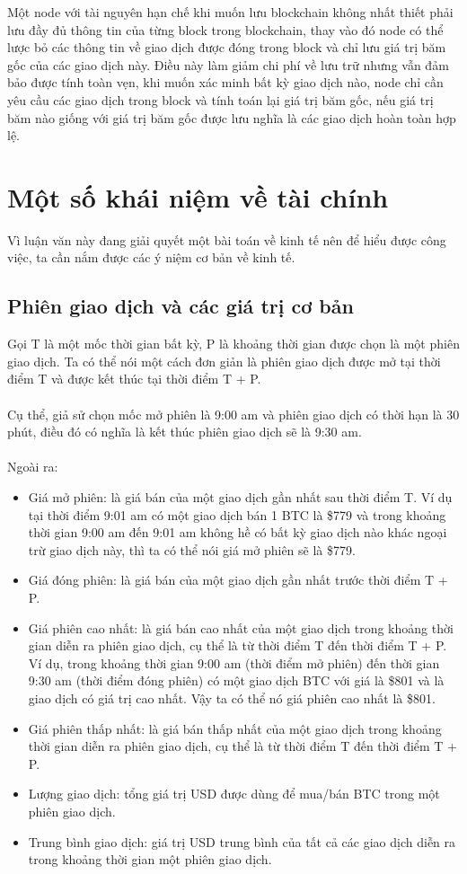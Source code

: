 Một node với tài nguyên hạn chế khi muốn lưu blockchain không nhất thiết phải 
lưu đầy đủ thông tin của từng block trong blockchain, thay vào đó node có thể 
lược bỏ các thông tin về giao dịch được đóng trong block và chỉ lưu giá trị băm 
gốc của các giao dịch này. Điều này làm giảm chi phí về lưu trữ nhưng vẫn đảm 
bảo được tính toàn vẹn, khi muốn xác minh bất kỳ giao dịch nào, node chỉ cần 
yêu cầu các giao dịch trong block và tính toán lại giá trị băm gốc, nếu giá trị 
băm nào giống với giá trị băm gốc được lưu nghĩa là các giao dịch hoàn toàn hợp 
lệ.
\section{Một số khái niệm về tài chính}
Vì luận văn này đang giải quyết một bài toán về kinh tế nên để hiểu được công 
việc, ta cần nắm được các ý niệm cơ bản về kinh tế.
\subsection{Phiên giao dịch và các giá trị cơ bản}
Gọi T là một mốc thời gian bất kỳ, P là khoảng thời gian được chọn là một phiên 
giao dịch. Ta có thể nói một cách đơn giản là phiên giao dịch được mở tại thời 
điểm T và được kết thúc tại thời điểm T + P.\\\\
Cụ thể, giả sử chọn mốc mở phiên là 9:00 am và phiên giao dịch có thời hạn là 
30 phút, điều đó có nghĩa là kết thúc phiên giao dịch sẽ là 9:30 am.\\\\
Ngoài ra:
\begin{itemize}
\item Giá mở phiên: là giá bán của một giao dịch gần nhất sau thời điểm T. Ví dụ tại thời 
điểm 9:01 am có một giao dịch bán 1 BTC là \$779 và trong khoảng thời gian 9:00 am 
đến 9:01 am không hề có bất kỳ giao dịch nào khác ngoại trừ giao dịch này, thì ta có thể 
nói giá mở phiên sẽ là \$779.
\item Giá đóng phiên: là giá bán của một giao dịch gần nhất trước thời điểm T + P.
\item Giá phiên cao nhất: là giá bán cao nhất của một giao dịch trong khoảng thời gian diễn ra phiên 
giao dịch, cụ thể là từ thời điểm T đến thời điểm T + P. Ví dụ, trong khoảng thời gian 9:00 am (thời điểm 
mở phiên) đến thời gian 9:30 am (thời điểm đóng phiên) có một giao dịch BTC với giá là 
\$801 và là giao dịch có giá trị cao nhất. Vậy ta có thể nó giá phiên cao nhất là 
\$801.
\item Giá phiên thấp nhất: là giá bán thấp nhất của một giao dịch trong khoảng thời gian diễn ra phiên 
giao dịch, cụ thể là từ thời điểm T đến thời điểm T + P.
\item Lượng giao dịch: tổng giá trị USD được dùng để  mua/bán BTC trong một phiên giao dịch.
\item Trung bình giao dịch: giá trị USD trung bình của tất cả các giao dịch diễn 
ra trong khoảng thời gian một phiên giao dịch.
\end{itemize}
